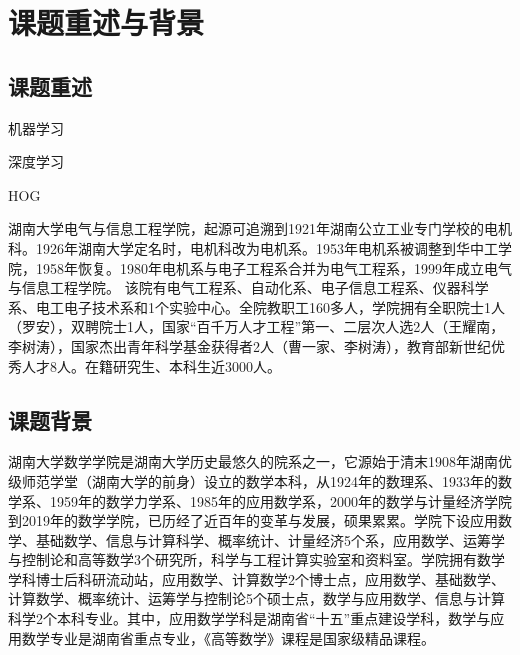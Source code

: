 \section{课题重述与背景}
\subsection{课题重述}

机器学习\cite{qiu2020nndl}

深度学习\cite{LeCun2015deep}

HOG\cite{dalal2005histograms}

湖南大学电气与信息工程学院，起源可追溯到1921年湖南公立工业专门学校的电机科。1926年湖南大学定名时，电机科改为电机系。1953年电机系被调整到华中工学院，1958年恢复。1980年电机系与电子工程系合并为电气工程系，1999年成立电气与信息工程学院。 该院有电气工程系、自动化系、电子信息工程系、仪器科学系、电工电子技术系和1个实验中心。全院教职工160多人，学院拥有全职院士1人（罗安），双聘院士1人，国家“百千万人才工程”第一、二层次人选2人（王耀南，李树涛），国家杰出青年科学基金获得者2人（曹一家、李树涛），教育部新世纪优秀人才8人。在籍研究生、本科生近3000人。
\subsection{课题背景}
湖南大学数学学院是湖南大学历史最悠久的院系之一，它源始于清末1908年湖南优级师范学堂（湖南大学的前身）设立的数学本科，从1924年的数理系、1933年的数学系、1959年的数学力学系、1985年的应用数学系，2000年的数学与计量经济学院到2019年的数学学院，已历经了近百年的变革与发展，硕果累累。学院下设应用数学、基础数学、信息与计算科学、概率统计、计量经济5个系，应用数学、运筹学与控制论和高等数学3个研究所，科学与工程计算实验室和资料室。学院拥有数学学科博士后科研流动站，应用数学、计算数学2个博士点，应用数学、基础数学、计算数学、概率统计、运筹学与控制论5个硕士点，数学与应用数学、信息与计算科学2个本科专业。其中，应用数学学科是湖南省“十五”重点建设学科，数学与应用数学专业是湖南省重点专业，《高等数学》课程是国家级精品课程。

\clearpage
